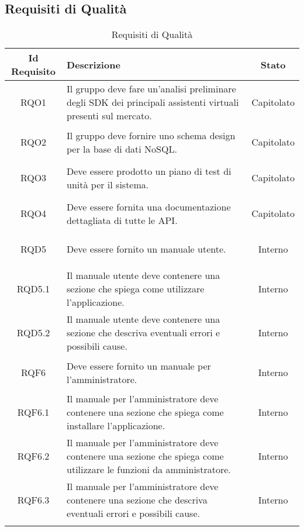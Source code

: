 \subsection{Requisiti di Qualità}
\normalsize
\begin{longtable}{|c|>{\centering}m{7cm}|c|}
	\hline
	\textbf{Id Requisito} & \textbf{Descrizione} & \textbf{Stato}\\
	\hline
	\endhead\hypertarget{RQO1}{RQO1} & Il gruppo deve fare un'analisi preliminare degli SDK dei principali assistenti virtuali presenti sul mercato. & Capitolato\\ \hline
	\hypertarget{RQO2}{RQO2} & Il gruppo deve fornire uno schema design per la base di dati NoSQL.
	& Capitolato\\ \hline
	\hypertarget{RQO3}{RQO3} & Deve essere prodotto un piano di test di unità per il sistema. & Capitolato\\ \hline
	\hypertarget{RQO4}{RQO4} & Deve essere fornita una documentazione dettagliata di tutte le API. & Capitolato\\ \hline
	\hypertarget{RQD5}{RQD5} & Deve essere fornito un manuale utente. & Interno\\ \hline
	\hypertarget{RQD5.1}{RQD5.1} & Il manuale utente deve contenere una sezione che spiega come utilizzare l'applicazione. & Interno\\ \hline
	\hypertarget{RQD5.2}{RQD5.2} & Il manuale utente deve contenere una sezione che descriva eventuali errori e possibili cause. & Interno\\ \hline
	\hypertarget{RQF6}{RQF6} & Deve essere fornito un manuale per l'amministratore. & Interno\\ \hline
	\hypertarget{RQF6.1}{RQF6.1} & Il manuale per l'amministratore deve contenere una sezione che spiega come installare l'applicazione. & Interno\\ \hline
	\hypertarget{RQF6.2}{RQF6.2} & Il manuale per l'amministratore deve contenere una sezione che spiega come utilizzare le funzioni da amministratore. & Interno\\ \hline
	\hypertarget{RQF6.3}{RQF6.3} & Il manuale per l'amministratore deve contenere una sezione che descriva eventuali errori e possibili cause. & Interno\\ \hline
	
	\caption[Requisiti di Qualità]{Requisiti di Qualità}
	\label{tabella:req2}
\end{longtable}
\clearpage

